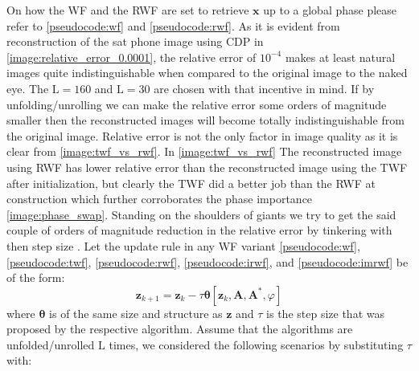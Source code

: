 On how the \ac{WF}\cite{Candes2014} and the \ac{RWF}\cite{Zhang2016} are set to retrieve $\boldsymbol{x}$ up to a global phase 
please refer to \cref{pseudocode:wf}\cite{Candes2014} and \cref{pseudocode:rwf}\cite{Zhang2016}. As it is evident from reconstruction 
of the sat phone image using \ac{CDP} in \cref{image:relative_error_0.0001}, the relative error of $10^{-4}$ 
makes at least natural images quite indistinguishable when compared to the original image to the naked eye. The 
$\mathrm{L}=160$ and $\mathrm{L}=30$ are chosen with that incentive in mind. If by unfolding/unrolling we can make 
the relative error some orders of magnitude smaller then the reconstructed images will become totally 
indistinguishable from the original image. Relative error is not the only factor in image quality as it is clear 
from \cref{image:twf_vs_rwf}. In \cref{image:twf_vs_rwf} The reconstructed image using \ac{RWF}\cite{Zhang2016} has lower relative error than the 
reconstructed image using the \ac{TWF}\cite{Chen2015} after initialization, but clearly the \ac{TWF}\cite{Chen2015} did a better job than the 
\ac{RWF}\cite{Zhang2016} at construction which further corroborates the phase importance \cite{Oppenheim1979}\cite{Oppenheim1981}\cite{Shechtman2015}\ref{image:phase_swap}. 
Standing on the shoulders of giants \cite{Gregor2010} we try to get the said couple of orders of magnitude reduction in the relative error by 
tinkering with then step size \cite{Gregor2010}. Let the update rule in any 
\ac{WF}\cite{Liu2019}\cite{Jaganathan2015} variant \cref{pseudocode:wf}, \ref{pseudocode:twf}, \ref{pseudocode:rwf}, \ref{pseudocode:irwf}, and \ref{pseudocode:imrwf} be of the form:
\begin{equation*}
  \boldsymbol{z}_{k+1} = \boldsymbol{z}_k - \tau\boldsymbol{\theta}[\boldsymbol{z}_k,\boldsymbol{A},\boldsymbol{A^*},\varphi]
\end{equation*}
where $\boldsymbol{\theta}$ is of the same size and structure as $\boldsymbol{z}$ and $\tau$ is the step size that was 
proposed by the respective algorithm. Assume that the algorithms are unfolded/unrolled $\mathrm{L}$ times, we considered the following 
scenarios by substituting $\tau$ with:

